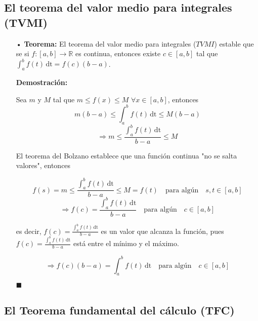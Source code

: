 \documentclass[pts12]{article}
\numberwithin{equation}{section}
\newcommand{\Col}{\color{ProcessBlue}}
\begin{document}
\subsection{\Col El teorema del valor medio para integrales (TVMI)}

\begin{itemize}

\item[\Col •] \textbf{Teorema:} El teorema del valor medio para integrales ($TVMI$) estable que se si $f:[a,b]\longrightarrow\mathbb{R}$ es continua, entonces existe $c\in [a,b]$ tal que $\int_{a}^{b} \! {f(t)} \, \mathrm{dt}=f(c)(b-a)$.

\textbf{Demostración:}

Sea $m$ y $M$ tal que $m\leq f(x)\leq M$ $\forall x\in [a,b]$, entonces
$$ m(b-a)\leq \int_{a}^{b} \! {f(t)} \, \mathrm{dt}\leq M(b-a) $$ 
$$ \Rightarrow m\leq \frac{\int_{a}^{b} \! {f(t)} \, \mathrm{dt}}{b-a}\leq M $$

El teorema del Bolzano establece que una función continua "no se salta valores", entonces

$$ f(s)=m\leq \frac{\int_{a}^{b} \! {f(t)} \, \mathrm{dt}}{b-a}\leq M=f(t) \quad \mbox{para algún} \quad s,t\in [a,b] $$
$$ \Rightarrow f(c)=\frac{\int_{a}^{b} \! {f(t)} \, \mathrm{dt}}{b-a} \quad \mbox{para algún} \quad c\in [a,b] $$

es decir, $f(c)=\frac{\int_{a}^{b} \! {f(t)} \, \mathrm{dt}}{b-a}$ es un valor que alcanza la función, pues $f(c)=\frac{\int_{a}^{b} \! {f(t)} \, \mathrm{dt}}{b-a}$ está entre el mínimo y el máximo.

$$\Rightarrow f(c)(b-a)=\int_{a}^{b} \! {f(t)} \, \mathrm{dt} \quad \mbox{para algún} \quad c\in [a,b] $$

\begin{flushright}
$\blacksquare$
\end{flushright}

\end{itemize}

\subsection{\Col El Teorema fundamental del cálculo (TFC)}
\end{document}
